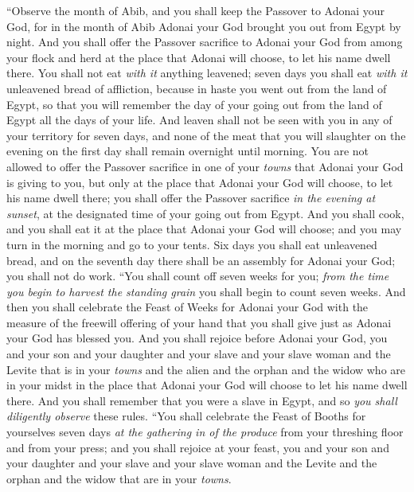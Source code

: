 \begin{biblechapter} %
\verse “Observe the month of Abib, and you shall keep the Passover to Adonai your God, for in the month of Abib Adonai your God brought you out from Egypt by night.
\verse And you shall offer the Passover sacrifice to Adonai your God from among your flock and herd at the place that Adonai will choose, to let his name dwell there.
\verse You shall not eat \textit{with it} anything leavened; seven days you shall eat \textit{with it} unleavened bread of affliction, because in haste you went out from the land of Egypt, so that you will remember the day of your going out from the land of Egypt all the days of your life.
\verse And leaven shall not be seen with you in any of your territory for seven days, and none of the meat that you will slaughter on the evening on the first day shall remain overnight until morning.
\verse You are not allowed to offer the Passover sacrifice in one of your \textit{towns} that Adonai your God is giving to you,
\verse but only at the place that Adonai your God will choose, to let his name dwell there; you shall offer the Passover sacrifice \textit{in the evening at sunset}, at the designated time of your going out from Egypt.
\verse And you shall cook, and you shall eat it at the place that Adonai your God will choose; and you may turn in the morning and go to your tents.
\verse Six days you shall eat unleavened bread, and on the seventh day there shall be an assembly for Adonai your God; you shall not do work.
\verse “You shall count off seven weeks for you; \textit{from the time you begin to harvest the standing grain} you shall begin to count seven weeks.
\verse And then you shall celebrate the Feast of Weeks for Adonai your God with the measure of the freewill offering of your hand that you shall give just as Adonai your God has blessed you.
\verse And you shall rejoice before Adonai your God, you and your son and your daughter and your slave and your slave woman and the Levite that is in your \textit{towns} and the alien and the orphan and the widow who are in your midst in the place that Adonai your God will choose to let his name dwell there.
\verse And you shall remember that you were a slave in Egypt, and so \textit{you shall diligently observe} these rules.
\verse “You shall celebrate the Feast of Booths for yourselves seven days \textit{at the gathering in of the produce} from your threshing floor and from your press;
\verse and you shall rejoice at your feast, you and your son and your daughter and your slave and your slave woman and the Levite and the orphan and the widow that are in your \textit{towns}.

\end{biblechapter}

